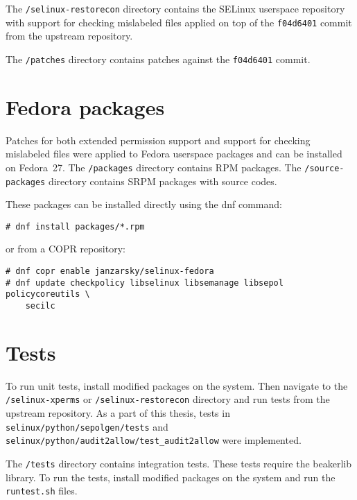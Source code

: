 The \texttt{/selinux-restorecon} directory contains the SELinux userspace
repository with support for checking mislabeled files applied on top of the
\texttt{f04d6401} commit from the upstream repository.

The \texttt{/patches} directory contains patches against the \texttt{f04d6401}
commit.

\section{Fedora packages}

Patches for both extended permission support and support for checking mislabeled
files were applied to Fedora userspace packages and can be installed on
Fedora~27. The \texttt{/packages} directory contains RPM packages. The
\texttt{/source-packages} directory contains SRPM packages with source codes.

These packages can be installed directly using the dnf command:
\begin{lstlisting}
# dnf install packages/*.rpm
\end{lstlisting}
or from a COPR repository:
\begin{lstlisting}
# dnf copr enable janzarsky/selinux-fedora
# dnf update checkpolicy libselinux libsemanage libsepol policycoreutils \
    secilc
\end{lstlisting}

\section{Tests}
To run unit tests, install modified packages on the system. Then navigate to the
\\ \texttt{/selinux-xperms} or \texttt{/selinux-restorecon} directory and run
tests from the upstream repository. As a part of this thesis, tests in
\texttt{selinux/python/sepolgen/tests} and \\
\texttt{selinux/python/audit2allow/test\_audit2allow} were implemented.

The \texttt{/tests} directory contains integration tests. These tests require
the beakerlib library. To run the tests, install modified packages on the system
and run the \texttt{runtest.sh} files.

